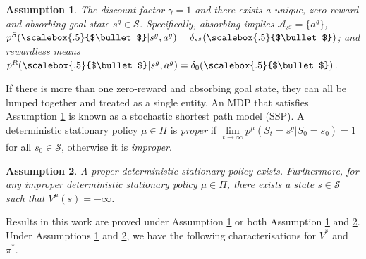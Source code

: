 \documentclass{amsart}
\newtheorem{assumption}{Assumption}
\renewcommand{\cdot}[1][.5]{%
  \mathbin{\vcenter{\hbox{\scalebox{#1}{$\bullet$}}}}%
}
\begin{document}
\begin{assumption}
    The discount factor $\gamma=1$ and there exists a unique, zero-reward and absorbing goal-state $s^g\in\mathcal{S}$. Specifically, absorbing implies  $\mathcal{A}_{s^g}=\{a^g\}$, $p^S(\cdot|s^g,a^g)=\delta_{s^g}(\cdot)$; and rewardless means $p^R(\cdot|s^g,a^g)=\delta_{0}(\cdot)$.\label{ass:boeunique1}
\end{assumption}
If there is more than one zero-reward and absorbing goal state, they can all be lumped together and treated as a single entity. An MDP that satisfies Assumption \ref{ass:boeunique1} is known as a stochastic shortest path model (SSP). A deterministic stationary policy $\mu \in \Pi$ is \textit{proper} if $\lim\limits_{t \rightarrow \infty} p^\mu(S_t=s^g|S_0=s_0) = 1$ for all $s_0 \in \mathcal{S}$, otherwise it is \textit{improper}.
\begin{assumption}
 A proper deterministic stationary policy exists. Furthermore, for any improper deterministic stationary policy $\mu \in \Pi$, there exists a state $s \in \mathcal{S}$ such that $V^\mu(s) = -\infty$.  \label{ass:boeunique2}
\end{assumption}

Results in this work are proved under Assumption \ref{ass:boeunique1} or both Assumption \ref{ass:boeunique1} and \ref{ass:boeunique2}. Under Assumptions \ref{ass:boeunique1} and \ref{ass:boeunique2}, we have the following characterisations for $V^*$ and $\pi^*$.
\end{document}
